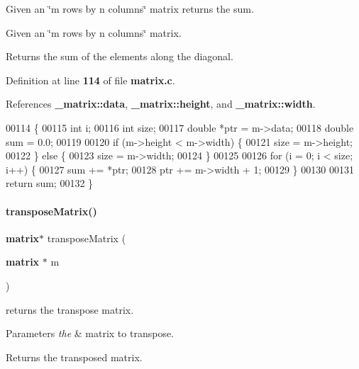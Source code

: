 Given an \char`\"{}m rows by n columns\char`\"{} matrix returns the sum. 

Given an \char`\"{}m rows by n columns\char`\"{} matrix.

\begin{DoxyReturn}{Returns}
the sum of the elements along the diagonal. 
\end{DoxyReturn}


Definition at line \textbf{ 114} of file \textbf{ matrix.\+c}.



References \textbf{ \+\_\+matrix\+::data}, \textbf{ \+\_\+matrix\+::height}, and \textbf{ \+\_\+matrix\+::width}.


\begin{DoxyCode}
00114                               \{
00115   \textcolor{keywordtype}{int} i;
00116   \textcolor{keywordtype}{int} size;
00117   \textcolor{keywordtype}{double} *ptr = m->data;
00118   \textcolor{keywordtype}{double} sum = 0.0;
00119 
00120   \textcolor{keywordflow}{if} (m->height < m->width) \{
00121     size = m->height;
00122   \} \textcolor{keywordflow}{else} \{
00123     size = m->width;
00124   \}
00125 
00126   \textcolor{keywordflow}{for} (i = 0; i < size; i++) \{
00127     sum += *ptr;
00128     ptr += m->width + 1;
00129   \}
00130 
00131   \textcolor{keywordflow}{return} sum;
00132 \}
\end{DoxyCode}
\mbox{\label{a00125_a2936260302742748b0639e8ec71d4d9f}} 
\paragraph{transpose\+Matrix()}
{\footnotesize\ttfamily \textbf{ matrix}$\ast$ transpose\+Matrix (\begin{DoxyParamCaption}\item[{\textbf{ matrix} $\ast$}]{m }\end{DoxyParamCaption})}



returns the transpose matrix. 


\begin{DoxyParams}{Parameters}
{\em the} & matrix to transpose. \\
\hline
\end{DoxyParams}
\begin{DoxyReturn}{Returns}
the transposed matrix. 
\end{DoxyReturn}


